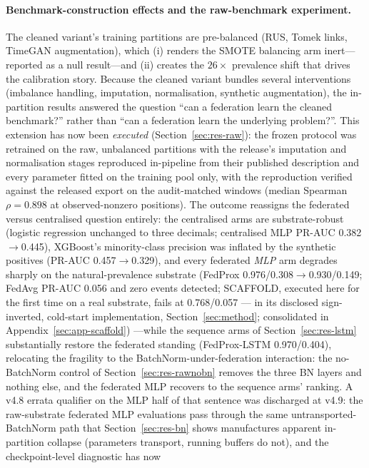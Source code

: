 \paragraph{Benchmark-construction effects and the raw-benchmark experiment.}
The cleaned variant's training partitions are pre-balanced (RUS,
Tomek links, TimeGAN augmentation), which (i) renders the SMOTE
balancing arm inert---reported as a null result---and (ii) creates
the $26\times$ prevalence shift that drives the calibration story.
Because the cleaned variant bundles several interventions (imbalance
handling, imputation, normalisation, synthetic augmentation), the
in-partition results answered the question ``can a federation learn
the cleaned benchmark?'' rather than ``can a federation learn the
underlying problem?''. This extension has now been \emph{executed}
(Section~\ref{sec:res-raw}): the frozen protocol was retrained on the
raw, unbalanced partitions with the release's imputation and
normalisation stages reproduced in-pipeline from their published
description and every parameter fitted on the training pool only,
with the reproduction verified against the released export on the
audit-matched windows (median Spearman $\rho=0.898$ at
observed-nonzero positions). The outcome reassigns the federated
versus centralised question entirely: the centralised arms are
substrate-robust (logistic regression unchanged to three decimals;
centralised MLP PR-AUC 0.382$\to$0.445), XGBoost's minority-class
precision was inflated by the synthetic positives (PR-AUC
0.457$\to$0.329), and every federated \emph{MLP} arm degrades sharply
on the natural-prevalence substrate (FedProx 0.976/0.308$\to$0.930/0.149;
FedAvg PR-AUC 0.056 and zero events detected; SCAFFOLD, executed
here for the first time on a real substrate, fails at 0.768/0.057 ---
in its disclosed sign-inverted, cold-start implementation,
Section~\ref{sec:method}; consolidated in
Appendix~\ref{sec:app-scaffold})
---while the sequence arms of Section~\ref{sec:res-lstm}
substantially restore the federated standing (FedProx-LSTM
0.970/0.404), relocating the fragility to the
BatchNorm-under-federation interaction: the no-BatchNorm control of
Section~\ref{sec:res-rawnobn} removes the three BN layers and nothing
else, and the federated MLP recovers to the sequence
arms' ranking. A v4.8 errata qualifier on
the MLP half of that sentence was discharged at v4.9: the raw-substrate
federated MLP evaluations pass through the same
untransported-BatchNorm path that Section~\ref{sec:res-bn} shows
manufactures apparent in-partition collapse (parameters transport,
running buffers do not), and the checkpoint-level diagnostic has now
